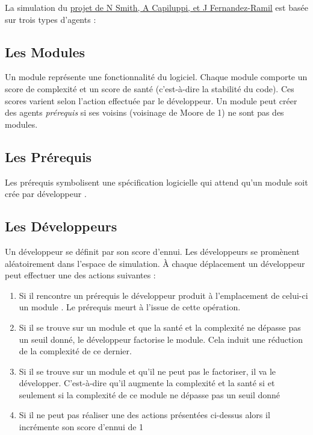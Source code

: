 \documentclass{article}
\begin{document}
La simulation du \href{http://oro.open.ac.uk/4698/1/}{projet de N Smith, A Capiluppi, et J Fernandez-Ramil} est basée sur trois types d'agents :

\subsection{Les Modules}
\label{sec:modul}
Un module représente une fonctionnalité du logiciel. Chaque module
comporte un score de complexité et un score de santé (c'est-à-dire la
stabilité du code). Ces scores varient selon l'action effectuée par le
développeur. Un module peut créer des agents \textit{prérequis} \up{\ref{sec:prer}} si ses voisins (voisinage de Moore de 1) ne sont pas des modules.

\newpage

\subsection{Les Prérequis}
\label{sec:prer}
Les prérequis symbolisent une spécification logicielle qui attend
qu'un module \up{\ref{sec:modul}} soit crée par développeur \up{\ref{sec:dev}}.

\subsection{Les Développeurs}
\label{sec:dev}
Un développeur se définit par son score d'ennui. Les développeurs se promènent aléatoirement dans l'espace de simulation. À chaque déplacement un développeur peut effectuer une des actions suivantes :

\begin{enumerate}
\item Si il rencontre un prérequis \up{\ref{sec:prer}} le développeur
  produit à l'emplacement de celui-ci un module \up{\ref{sec:modul}}. Le prérequis meurt à l'issue de cette opération.
\item{Si il se trouve sur un module et que la santé et la complexité ne dépasse pas un seuil donné, le développeur factorise le module. Cela induit une réduction de la complexité de ce dernier.}
\item{Si il se trouve sur un module et qu'il ne peut pas le factoriser, il va le développer. C'est-à-dire qu'il augmente la complexité et la santé si et seulement si la complexité de ce module ne dépasse pas un seuil donné}
\item{Si il ne peut pas réaliser une des actions présentées ci-dessus alors il incrémente son score d'ennui de 1}
\end{enumerate}
\end{document}
